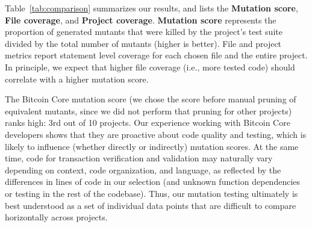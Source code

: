 Table~\ref{tab:comparison} summarizes our results, and lists the
\textbf{Mutation score}, \textbf{File coverage}, and \textbf{Project coverage}. \textbf{Mutation score} represents the proportion of
generated mutants that were killed by the project's test suite divided by the total number
of mutants (higher is better). File and project metrics report statement level coverage
for each chosen file and the entire project. In principle, we expect that higher file coverage
(i.e., more tested code) should correlate with a higher mutation
score.

The Bitcoin Core mutation score (we chose the score before manual
pruning of equivalent mutants, since we did not perform that pruning
for other projects) ranks high: 3rd out of 10 projects. Our experience
working with Bitcoin Core developers shows that they are proactive about code
quality and testing, which is likely to influence (whether directly or
indirectly) mutation scores.  At the same time, code
for transaction verification and validation may naturally vary depending on
context, code organization, and language, as reflected by the differences in
lines of code in our selection (and unknown function dependencies or testing in
the rest of the codebase). Thus, our mutation testing
ultimately is best understood as a set of individual data points that are difficult to compare
horizontally across projects.
%



%
%

